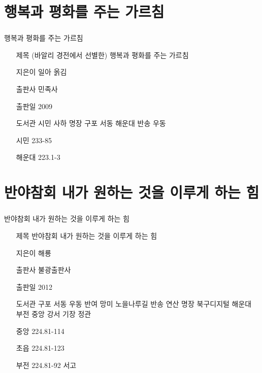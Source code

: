 \documentclass[aspectratio=1610,14pt,xcolor=pdftex,dvipsnames,table,handout]{beamer}
\begin{document}
		\section{ 행복과 평화를 주는 가르침 }
		\begin{frame} [t,plain]
		\frametitle{}
			\begin{block} { 행복과 평화를 주는 가르침 }
			\setlength{\leftmargini}{4em}			
			\begin{itemize}
				\item [제목]  	(바알리 경전에서 선별한) 행복과 평화를 주는 가르침 
				\item [지은이]	일아 옭김
				\item [출판사]	민족사
				\item [출판일]	2009
				\item [도서관]	시민 사하 명장 구포 서동 해운대 반송 우동 
				\item [시민]		233-85
				\item [해운대]	223.1-3
			\end{itemize}
			\end{block}						
		\end{frame}						



		\section{ 반야참회 내가 원하는 것을 이루게 하는 힘 }
		\begin{frame} [t,plain]
		\frametitle{}
			\begin{block} { 반야참회 내가 원하는 것을 이루게 하는 힘 }
			\setlength{\leftmargini}{4em}			
			\begin{itemize}
				\item [제목]  	반야참회 내가 원하는 것을 이루게 하는 힘 
				\item [지은이]	해룡
				\item [출판사]	불광출판사
				\item [출판일]	2012
				\item [도서관]	구포 서동 우동 반여 망미 노을나루길 반송 연산 명장 북구디지털 해운대 부전 중앙 강서 기장 정관
				\item [중앙]		224.81-114
				\item [초읍]		224.81-123
				\item [부전]		224.81-92 서고
			\end{itemize}
			\end{block}						
		\end{frame}						
\end{document}
